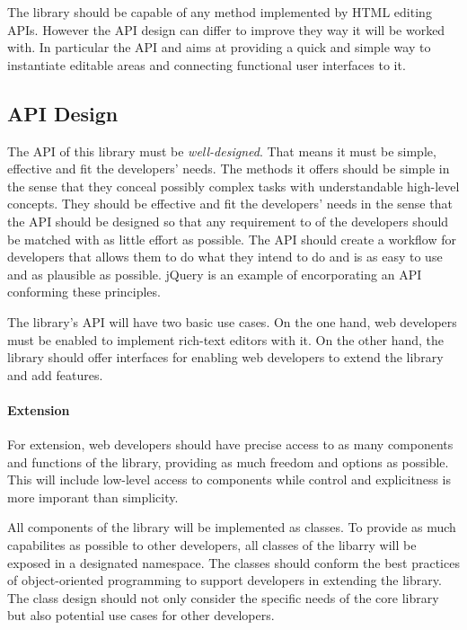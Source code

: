 The library should be capable of any method implemented by HTML editing APIs. However the API design can differ to improve they way it will be worked with. In particular the API and aims at providing a quick and simple way to instantiate editable areas and connecting functional user interfaces to it.

\subsection{API Design}


The API of this library must be \textit{well-designed}. That means it must be simple, effective and fit the developers' needs. The methods it offers should be simple in the sense that they conceal possibly complex tasks with understandable high-level concepts. They should be effective and fit the developers' needs in the sense that the API should be designed so that any requirement to of the developers should be matched with as little effort as possible. The API should create a workflow for developers that allows them to do what they intend to do and is as easy to use and as plausible as possible. jQuery is an example of encorporating an API conforming these principles.

The library's API will have two basic use cases. On the one hand, web developers must be enabled to implement rich-text editors with it. On the other hand, the library should offer interfaces for enabling web developers to extend the library and add features.

\paragraph{Extension}

For extension, web developers should have precise access to as many components and functions of the library, providing as much freedom and options as possible. This will include low-level access to components while control and explicitness is more imporant than simplicity. 

All components of the library will be implemented as classes. To provide as much capabilites as possible to other developers, all classes of the libarry will be exposed in a designated namespace. The classes should conform the best practices of object-oriented programming to support developers in extending the library. The class design should not only consider the specific needs of the core library but also potential use cases for other developers.

